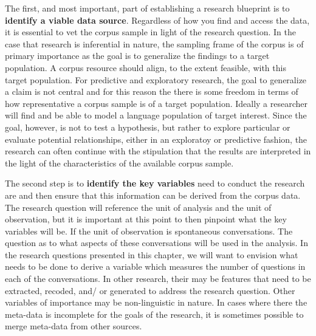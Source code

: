 \documentclass[
  letterpaper,
]{latex/krantz}
\begin{document}
The first, and most important, part of establishing a research blueprint
is to \textbf{identify a viable data source}. Regardless of how you find
and access the data, it is essential to vet the corpus sample in light
of the research question. In the case that research is inferential in
nature, the sampling frame of the corpus is of primary importance as the
goal is to generalize the findings to a target population. A corpus
resource should align, to the extent feasible, with this target
population. For predictive and exploratory research, the goal to
generalize a claim is not central and for this reason the there is some
freedom in terms of how representative a corpus sample is of a target
population. Ideally a researcher will find and be able to model a
language population of target interest. Since the goal, however, is not
to test a hypothesis, but rather to explore particular or evaluate
potential relationships, either in an exploratoy or predictive fashion,
the research can often continue with the stipulation that the results
are interpreted in the light of the characteristics of the available
corpus sample.

The second step is to \textbf{identify the key variables} need to
conduct the research are and then ensure that this information can be
derived from the corpus data. The research question will reference the
unit of analysis and the unit of observation, but it is important at
this point to then pinpoint what the key variables will be. If the unit
of observation is spontaneous conversations. The question as to what
aspects of these conversations will be used in the analysis. In the
research questions presented in this chapter, we will want to envision
what needs to be done to derive a variable which measures the number of
questions in each of the conversations. In other research, their may be
features that need to be extracted, recoded, and/ or generated to
address the research question. Other variables of importance may be
non-linguistic in nature. In cases where there the meta-data is
incomplete for the goals of the research, it is sometimes possible to
merge meta-data from other sources.
\end{document}
